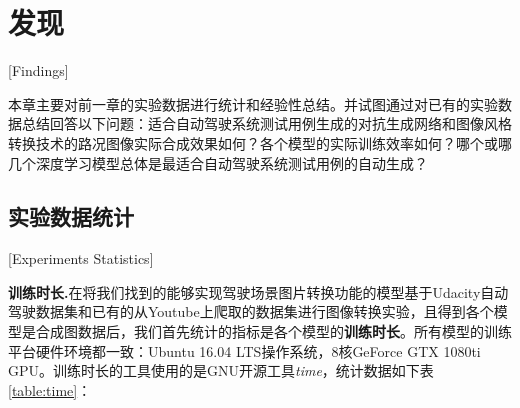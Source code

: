 
\chapter{发现}[Findings]

本章主要对前一章的实验数据进行统计和经验性总结。并试图通过对已有的实验数据总结回答以下问题：适合自动驾驶系统测试用例生成的对抗生成网络和图像风格转换技术的路况图像实际合成效果如何？各个模型的实际训练效率如何？哪个或哪几个深度学习模型总体是最适合自动驾驶系统测试用例的自动生成？

\section{实验数据统计}[Experiments Statistics]

\textbf{训练时长.}\quad 在将我们找到的能够实现驾驶场景图片转换功能的模型基于Udacity自动驾驶数据集\cite{udacity_dataset}和已有的从Youtube上爬取的数据集进行图像转换实验，且得到各个模型是合成图数据后，我们首先统计的指标是各个模型的\textbf{训练时长}。所有模型的训练平台硬件环境都一致：Ubuntu 16.04 LTS操作系统，8核GeForce GTX 1080ti GPU。训练时长的工具使用的是GNU开源工具\textit{time}，统计数据如下表\ref{table:time}：

